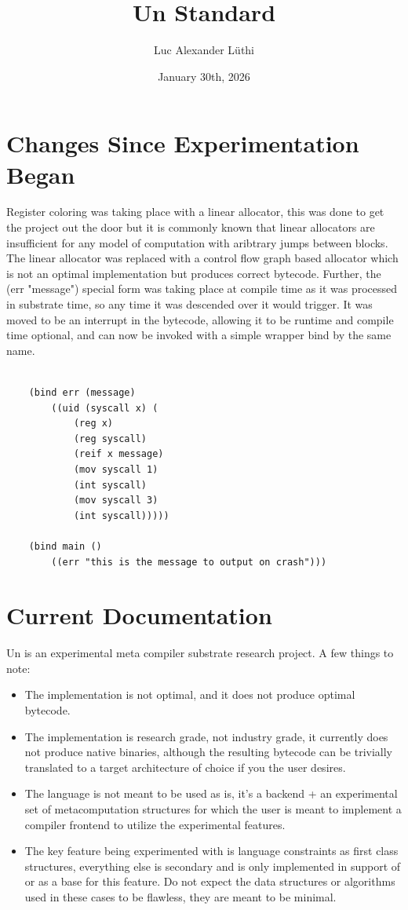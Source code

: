 \documentclass{article}
\title{Un Standard}
\author{Luc Alexander L{\"u}thi}
\date{January 30th, 2026}
\begin{document}
	\maketitle
	\tableofcontents
	\section{Changes Since Experimentation Began}
	Register coloring was taking place with a linear allocator, this was done to get the project out the door but it is commonly known that linear allocators are insufficient for any model of computation with aribtrary jumps between blocks. The linear allocator was replaced with a control flow graph based allocator which is not an optimal implementation but produces correct bytecode. Further, the (err "message") special form was taking place at compile time as it was processed in substrate time, so any time it was descended over it would trigger. It was moved to be an interrupt in the bytecode, allowing it to be runtime and compile time optional, and can now be invoked with a simple wrapper bind by the same name.
	\begin{Verbatim}[tabsize=4]

	(bind err (message)
		((uid (syscall x) (
			(reg x)
			(reg syscall)
			(reif x message)
			(mov syscall 1)
			(int syscall)
			(mov syscall 3)
			(int syscall)))))
	
	(bind main ()
		((err "this is the message to output on crash")))

	\end{Verbatim}
	\section{Current Documentation}
	Un is an experimental meta compiler substrate research project. A few things to note:

	\begin{itemize}
		\item[] The implementation is not optimal, and it does not produce optimal bytecode.
		\item[] The implementation is research grade, not industry grade, it currently does not produce native binaries, although the resulting bytecode can be trivially translated to a target architecture of choice if you the user desires.
		\item[] The language is not meant to be used as is, it's a backend + an experimental set of metacomputation structures for which the user is meant to implement a compiler frontend to utilize the experimental features.
		\item[] The key feature being experimented with is language constraints as first class structures, everything else is secondary and is only implemented in support of or as a base for this feature. Do not expect the data structures or algorithms used in these cases to be flawless, they are meant to be minimal.
	\end{itemize}
\end{document}
